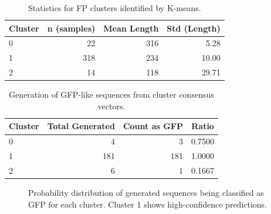 \documentclass[unnumsec,webpdf,contemporary,medium]{oup-authoring-template}
\begin{document}
\begin{table}[!ht]
\caption{Statistics for FP clusters identified by K-means.}\label{tab:cluster_stats}
\centering
\begin{tabular}{@{}lrrr@{}}
\toprule
\textbf{Cluster} & \textbf{n (samples)} & \textbf{Mean Length} & \textbf{Std (Length)} \\
\midrule
0 & 22 & 316 & 5.28 \\
1 & 318 & 234 & 10.00 \\
2 & 14 & 118 & 29.71 \\
\bottomrule
\end{tabular}
\end{table}

\begin{table}[!ht]
\caption{Generation of GFP-like sequences from cluster consensus vectors.}\label{tab:gfp_generation}
\centering
\begin{tabular}{@{}lrrr@{}}
\toprule
\textbf{Cluster} & \textbf{Total Generated} & \textbf{Count as GFP} & \textbf{Ratio} \\
\midrule
0 & 4 & 3 & 0.7500 \\
1 & 181 & 181 & 1.0000 \\
2 & 6 & 1 & 0.1667 \\
\bottomrule
\end{tabular}
\end{table}

\begin{figure}[!ht]
    \centering
    \hfill
    \hfill
    \caption{Probability distribution of generated sequences being classified as GFP for each cluster. Cluster 1 shows high-confidence predictions.}
    \label{fig:cluster_probs}
\end{figure}
\end{document}
